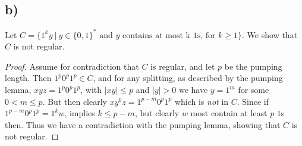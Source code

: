 \documentclass[a4paper,11pt]{article}
\newcommand{\abs}[1]{\left\lvert #1 \right\rvert}
\numberwithin{equation}{section}
\begin{document}
\subsection*{b)}
Let $C=\{1^ky\ \vert\ y\in\{0,1\}^\ast\text{ and $y$ contains at most k $1$s, for }k\geq1\}$. We show that $C$ is not regular.
\begin{proof}
Assume for contradiction that $C$ is regular, and let $p$ be the pumping length. Then $1^p0^p1^p\in C$, and for any splitting, as described by the pumping lemma, $xyz=1^p0^p1^p$, with $\abs{xy}\leq p$ and $\abs{y}>0$ we have $y=1^m$ for some $0<m\leq p$. But then clearly $xy^0z=1^{p-m}0^p1^p$ which is \emph{not} in $C$. Since if $1^{p-m}0^p1^p=1^kw$, implies $k\leq p-m$, but clearly $w$ most contain at least $p$ $1$s then. Thus we have a contradiction with the pumping lemma, showing that $C$ is not regular.
\end{proof}
\end{document}
